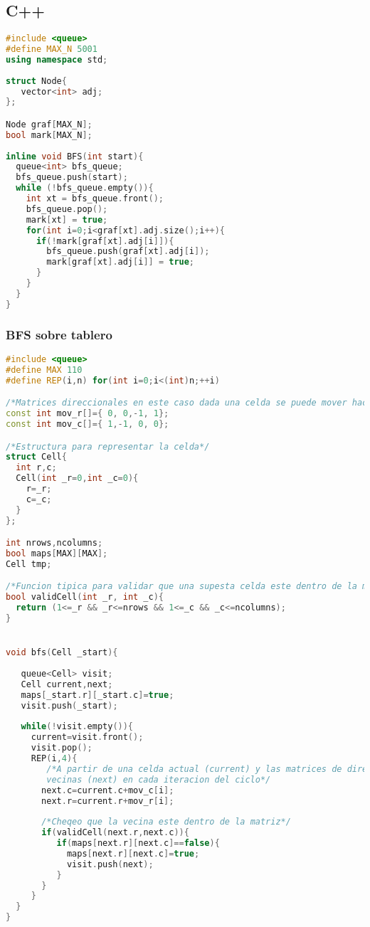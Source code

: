 \subsection{C++}
\begin{lstlisting}[language=C++]
#include <queue>
#define MAX_N 5001
using namespace std;
	
struct Node{
   vector<int> adj;
};

Node graf[MAX_N];
bool mark[MAX_N];
	
inline void BFS(int start){
  queue<int> bfs_queue;
  bfs_queue.push(start);
  while (!bfs_queue.empty()){
    int xt = bfs_queue.front();
    bfs_queue.pop();
	mark[xt] = true;
	for(int i=0;i<graf[xt].adj.size();i++){
      if(!mark[graf[xt].adj[i]]){
        bfs_queue.push(graf[xt].adj[i]);
        mark[graf[xt].adj[i]] = true;
      }
    }
  }
}


\end{lstlisting} 

\subsubsection{BFS sobre tablero}

\begin{lstlisting}[language=C++]
#include <queue>
#define MAX 110
#define REP(i,n) for(int i=0;i<(int)n;++i)

/*Matrices direccionales en este caso dada una celda se puede mover hacia una de la celda vecinas en la vertical u horizontal el primer arreglo indica desplazamiento en la filas mientras el segundo es la columna el primer par ordenado hace referencia a la posicion a la derecha de la celda que este parado en ese momento, el segundo par es la celda a la izquierda mientras tercer y cuarto par son las celdas de arriba y abajo respectivamente */
const int mov_r[]={ 0, 0,-1, 1};
const int mov_c[]={ 1,-1, 0, 0};

/*Estructura para representar la celda*/
struct Cell{
  int r,c;
  Cell(int _r=0,int _c=0){
    r=_r;
    c=_c;
  }
};

int nrows,ncolumns;
bool maps[MAX][MAX];
Cell tmp;

/*Funcion tipica para validar que una supesta celda este dentro de la matriz que trabajo*/
bool validCell(int _r, int _c){
  return (1<=_r && _r<=nrows && 1<=_c && _c<=ncolumns);
}


void bfs(Cell _start){
   
   queue<Cell> visit;
   Cell current,next;
   maps[_start.r][_start.c]=true;
   visit.push(_start);
	
   while(!visit.empty()){
     current=visit.front();
     visit.pop();
     REP(i,4){
     	/*A partir de una celda actual (current) y las matrices de direccion genero cada una de las posibles 
     	vecinas (next) en cada iteracion del ciclo*/
       next.c=current.c+mov_c[i];
       next.r=current.r+mov_r[i];
       
       /*Cheqeo que la vecina este dentro de la matriz*/
       if(validCell(next.r,next.c)){
          if(maps[next.r][next.c]==false){
            maps[next.r][next.c]=true;
            visit.push(next);
          }
       }
     }
  }
}	
\end{lstlisting} 

